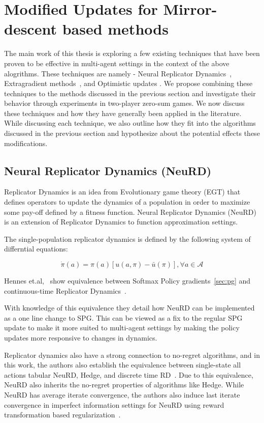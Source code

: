 \chapter{Modified Updates for Mirror-descent based methods}

The main work of this thesis is exploring a few existing techniques that have been proven to be 
effective in multi-agent settings in the context of the above alogrithms.
These techniques are namely - Neural Replicator Dynamics~\cite{hennesNeural2020}, Extragradient methods~\cite{korpelevichextragradient1976}, and Optimistic updates \red{[?]}. 
We propose combining these techniques to the methods discussed in the previous section and
investigate their behavior through experiments in two-player zero-sum games.
We now discuss these techniques and how they have generally been applied in the literature. 
While discussing each technique, we also outline how they fit into the algorithms discussed 
in the previous section and hypothesize about the potential effects these modifications.

\section{Neural Replicator Dynamics (NeuRD)}
Replicator Dynamics is an idea from Evolutionary game theory (EGT) that defines operators to update
the dynamics of a population in order to maximize some pay-off defined by a fitness function.
Neural Replicator Dynamics (NeuRD) is an extension of Replicator Dynamics 
to function approximation settings.

The single-population replicator dynamics is defined by the following system of differntial
equations:

\begin{equation}
	\label{eqn:rd} \dot{\pi}(a) = \pi(a)[u(a, \pi) -
		\bar{u}(\pi)], \forall a \in \mathcal{A}
\end{equation}

Hennes et.al,~\cite{hennesNeural2020} show equivalence between Softmax Policy gradients~\ref{sec:pg} and
continuous-time Replicator Dynamics~\cite[THEOREM 1, on p5]{hennesNeural2020}\label{thm:spgrd}.

With knowledge of this equivalence they detail how NeuRD can be implemented as a one line change to SPG.
This can be viewed as a fix to the regular SPG update to make it more suited to multi-agent settings 
by making the policy updates more responsive to changes in dynamics.

Replicator dynamics also have a strong connection to no-regret algorithms, and in this work, the authors also establish 
the equivalence between single-state all actions tabular NeuRD, Hedge, and discrete time RD~\cite[Statement 1, p5]{hennesNeural2020}.
Due to this equivalence, NeuRD also inherits the no-regret properties of algorithms like Hedge.
While NeuRD has average iterate convergence, the authors also induce last iterate convergence in imperfect 
information settings for NeuRD using reward transformation based regularization~\cite{perolatPoincare2021}.


